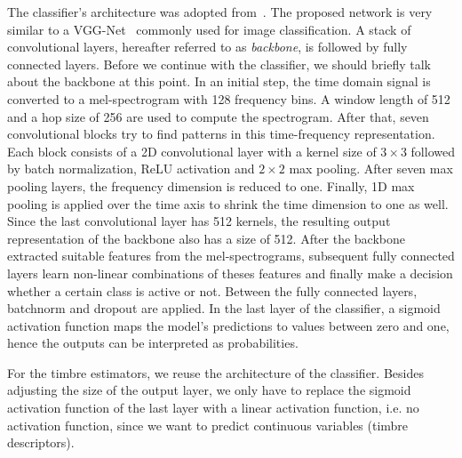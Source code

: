 \documentclass{article}
\begin{document}
The classifier's architecture was adopted from~\cite{won2020evaluation}. The proposed network is very similar to a VGG-Net~\cite{simonyan2014very} commonly used for image classification. A stack of convolutional layers, hereafter referred to as \textit{backbone}, is followed by fully connected layers. Before we continue with the classifier, we should briefly talk about the backbone at this point. In an initial step, the time domain signal is converted to a mel-spectrogram with 128 frequency bins. A window length of 512 and a hop size of 256 are used to compute the spectrogram. After that, seven convolutional blocks try to find patterns in this time-frequency representation. Each block consists of a 2D convolutional layer with a kernel size of $3\times3$ followed by batch normalization, ReLU activation and $2\times2$ max pooling. After seven max pooling layers, the frequency dimension is reduced to one. Finally, 1D max pooling is applied over the time axis to shrink the time dimension to one as well. Since the last convolutional layer has 512 kernels, the resulting output representation of the backbone also has a size of 512. After the backbone extracted suitable features from the mel-spectrograms, subsequent fully connected layers learn non-linear combinations of theses features and finally make a decision whether a certain class is active or not. Between the fully connected layers, batchnorm and dropout are applied. In the last layer of the classifier, a sigmoid activation function maps the model's predictions to values between zero and one, hence the outputs can be interpreted as probabilities.

For the timbre estimators, we reuse the architecture of the classifier. Besides adjusting the size of the output layer, we only have to replace the sigmoid activation function of the last layer with a linear activation function, i.e. no activation function, since we want to predict continuous variables (timbre descriptors).
\end{document}
